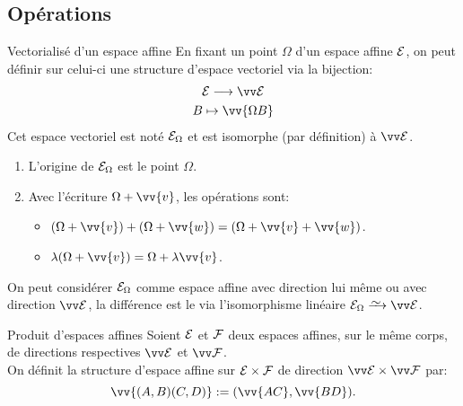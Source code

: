 \documentclass{m53beamer}
\begin{document}
\subsection{Opérations}
  \begin{frame}{Vectorialisé d'un espace affine}
    En fixant un point $\Omega$ d'un espace affine $\mathcal{E}$, on peut définir sur celui-ci une structure d'espace vectoriel via la bijection:
    \begin{gather*}
      \ens{E} \longrightarrow \ev{E}\\
      B \mapsto \vv{\Omega B}
    \end{gather*}\pause
    Cet espace vectoriel est noté $\mathcal{E}_{\Omega}$ et est isomorphe (par définition) à $\ev{E}$.
    \begin{enumerate}[<+(1)->]
      \item L'origine de $\mathcal{E}_{\Omega}$ est le point $\Omega$.
      \item Avec l'écriture $\Omega+\vv{v}$, les opérations sont:
      \begin{itemize}[<+(1)->]
        \item $(\Omega+\vv{v})+(\Omega+\vv{w})=(\Omega+\vv{v}+\vv{w})$.
        \item $\lambda(\Omega+\vv{v})=\Omega+\lambda\vv{v}$.
      \end{itemize}
    \end{enumerate}\pause
    \begin{remarque}
      On peut considérer $\mathcal{E}_{\Omega}$ comme espace affine avec direction lui même \pause ou avec direction $\ev{E}$\pause, la différence est le  via l'isomorphisme linéaire $\ens{E}_{\Omega}\isoto\ev{E}$.
    \end{remarque}
  \end{frame}
  \begin{frame}{Produit d'espaces affines}
    Soient $\mathcal{E}$ et $\mathcal{F}$ deux espaces affines, sur le même corps, de directions respectives $\ev{E}$ et $\ev{F}$.\\
    On définit la structure d'espace affine  sur $\mathcal{E} \times \mathcal{F}$ de direction $\ev{E} \times \ev{F}$ par:
    $$
      \vv{(A,B)(C,D)}:=(\vv{AC},\vv{BD}).
    $$
  \end{frame}
\end{document}
